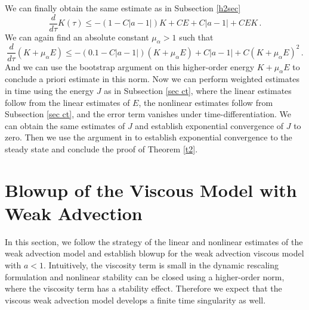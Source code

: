 \documentclass[12pt]{caltech_thesis}
\numberwithin{equation}{section}
\begin{document}
We can finally obtain the same estimate as in Subsection \ref{h2sec} 
$$\frac{d}{d\tau}K(\tau)\leq -(1-C|a-1|)K+CE+C|a-1|+CEK\,.$$
We can again find an absolute constant $\mu_\alpha>1$ such that $$\frac{d}{d\tau}(K+\mu_\alpha E)\leq-(0.1-C|a-1|)(K+\mu_\alpha E)+C|a-1|+C(K+\mu_\alpha E)^2\,.$$
And we can use the bootstrap argument on this higher-order energy $K+\mu_\alpha E$ to conclude a priori estimate in this norm. Now we can perform weighted estimates in time using the energy $J$ as in Subsection \ref{sec ct}, where the linear estimates follow from the linear estimates of $E$, the nonlinear estimates follow from Subsection \ref{sec ct}, and the error term vanishes under time-differentiation. We can obtain the same estimates of $J$ and establish exponential convergence of $J$ to zero. Then we use the argument in \cite{chen2021finite,chen2021slightly} to establish exponential convergence to the steady state and conclude the proof of Theorem \ref{t2}.
 \section{Blowup of the Viscous Model with Weak Advection}\label{sec5}
In this section, we follow the strategy of the linear and nonlinear estimates of the weak advection model and establish blowup  for the weak advection viscous model with $a<1$.   Intuitively, the viscosity term is small in the dynamic rescaling formulation and nonlinear stability can be closed using a higher-order norm, where the viscosity term has a stability effect. Therefore we expect that the viscous weak advection model develops a finite time singularity as well. 
\end{document}

